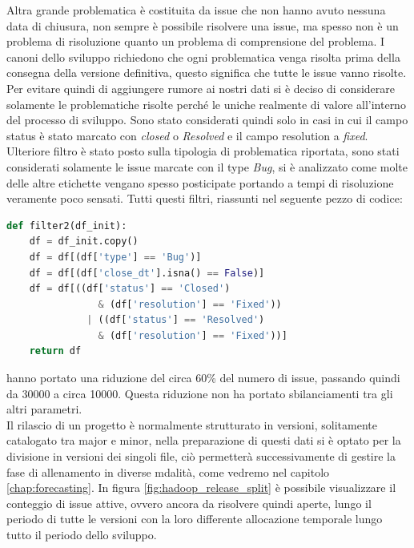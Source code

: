 \documentclass[%
    corpo=12pt,
    twoside,
    oldstyle,
    autoretitolo,
    greek,
    evenboxes,
]{toptesi}
\begin{document}
Altra grande problematica è costituita da issue che non hanno avuto nessuna data di chiusura, non sempre è possibile risolvere una issue, ma spesso non è un problema di risoluzione quanto un problema di comprensione del problema. I canoni dello sviluppo richiedono che ogni problematica venga risolta prima della consegna della versione definitiva, questo significa che tutte le issue vanno risolte. Per evitare quindi di aggiungere rumore ai nostri dati si è deciso di considerare solamente le problematiche risolte perché le uniche realmente di valore all'interno del processo di sviluppo. Sono stato considerati quindi solo in casi in cui il campo status è stato marcato con \textit{closed} o \textit{Resolved} e il campo resolution a \textit{fixed}.
Ulteriore filtro è stato posto sulla tipologia di problematica riportata, sono stati considerati solamente le issue marcate con il type \textit{Bug}, si è analizzato come molte delle altre etichette vengano spesso posticipate portando a tempi di risoluzione veramente poco sensati. Tutti questi filtri, riassunti nel seguente pezzo di codice:
\begin{lstlisting}[language=Python, frame=single, basicstyle=\small]
  def filter2(df_init):
    df = df_init.copy()
    df = df[(df['type'] == 'Bug')]
    df = df[(df['close_dt'].isna() == False)]
    df = df[((df['status'] == 'Closed') 
                & (df['resolution'] == 'Fixed')) 
              | ((df['status'] == 'Resolved') 
                & (df['resolution'] == 'Fixed'))]
    return df
\end{lstlisting}
hanno portato una riduzione del circa 60\% del numero di issue, passando quindi da 30000 a circa 10000. Questa riduzione non ha portato sbilanciamenti tra gli altri parametri.\\
Il rilascio di un progetto è normalmente strutturato in versioni, solitamente catalogato tra major e minor, nella preparazione di questi dati si è optato per la divisione in versioni dei singoli file, ciò permetterà successivamente di gestire la fase di allenamento in diverse mdalità, come vedremo nel capitolo \ref{chap:forecasting}. In figura \ref{fig:hadoop_release_split} è possibile visualizzare il conteggio di issue attive, ovvero ancora da risolvere quindi aperte, lungo il periodo di tutte le versioni con la loro differente allocazione temporale lungo tutto il periodo dello sviluppo.\\
\end{document}
